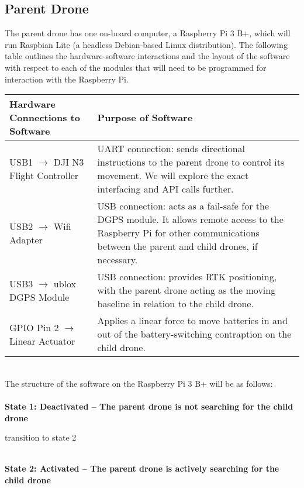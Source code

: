 \documentclass[paper=a4, fontsize=10pt]{scrartcl}
\begin{document}
\newpage
\subsection*{Parent Drone}
The parent drone has one on-board computer, a Raspberry Pi 3 B+, which will run Raspbian Lite (a headless Debian-based Linux distribution). The following table outlines the hardware-software interactions and the layout of the software with respect to each of the modules that will need to be programmed for interaction with the Raspberry Pi.\\%
\begin{table}[h!]
	\centering
	\begin{tabular}{|l|p{}|}
		\hline
		\textbf{Hardware Connections to Software} & \textbf{Purpose of Software}\\%
		\hline
		\hline
		USB1 $\rightarrow$ DJI N3 Flight Controller & UART connection: sends directional instructions to the parent drone to control its movement. We will explore the exact interfacing and API calls further.\\%
		\hline
		USB2 $\rightarrow$ Wifi Adapter & USB connection: acts as a fail-safe for the DGPS module. It allows remote access to the Raspberry Pi for other communications between the parent and child drones, if necessary.\\%
		\hline
		USB3 $\rightarrow$ ublox DGPS Module & USB connection: provides RTK positioning, with the parent drone acting as the moving baseline in relation to the child drone.\\%
		\hline
		GPIO Pin 2 $\rightarrow$ Linear Actuator & Applies a linear force to move batteries in and out of the battery-switching contraption on the child drone.\\%
		\hline
	\end{tabular}
\end{table}
\hfill\\%
The structure of the software on the Raspberry Pi 3 B+ will be as follows:\\%
\\%
\textbf{State 1: Deactivated -- The parent drone is not searching for the child drone}\\%
\begin{algorithm}[H]
	transition to state 2\;
\end{algorithm}
\hfill\\%
\textbf{State 2: Activated -- The parent drone is actively searching for the child drone}\\%
\end{document}
